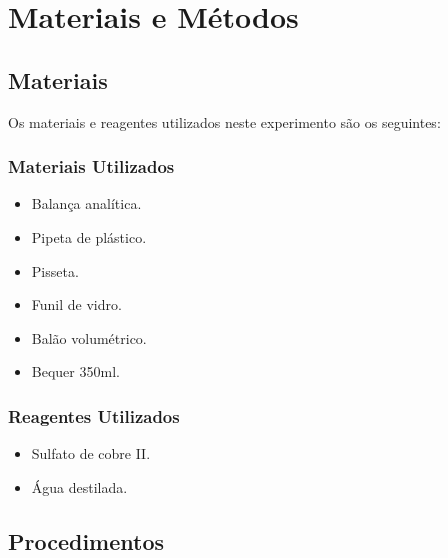 \documentclass[a4paper, 11pt]{article}
\begin{document}
\section{Materiais e Métodos}\label{sec:materiais_metodos}
    \subsection{Materiais}\label{sec:materiais}
        \indent Os materiais e reagentes utilizados neste experimento são os seguintes\@:
        \subsubsection{Materiais Utilizados}\label{sec:materiais_utilizados}
            \begin{itemize}
                \item Balança analítica\@.
                \item Pipeta de plástico\@.
                \item Pisseta\@.
                \item Funil de vidro\@.
                \item Balão volumétrico\@.
                \item Bequer 350ml\@.
            \end{itemize}
        \doublespacing
        \subsubsection{Reagentes Utilizados}\label{sec:reagentes_utilizados}
            \begin{itemize}
                \item Sulfato de cobre II\@.
                \item Água destilada\@.
            \end{itemize}
        \doublespacing

    \subsection{Procedimentos}\label{sec:procedimentos}
\end{document}
